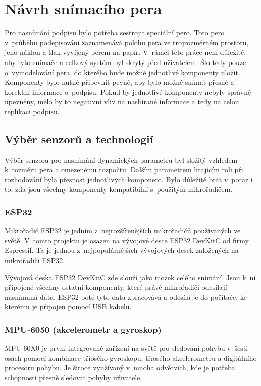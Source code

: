 \chapter{Návrh snímacího pera}
Pro nasnímání podpisu bylo potřeba sestrojit speciální pero.                                        %
Toto pero v~průběhu podepisování zaznamenává polohu pera ve trojrozměrném prostoru,                 %
jeho náklon a tlak vyvíjený perem na papír.                                                         %
V~rámci této práce není důležité, aby tyto snímače a celkový systém byl skrytý před uživatelem.     %
Šlo tedy pouze o~vymodelování pera, do kterého bude možné jednotlivé komponenty uložit.             %
Komponenty bylo nutné připevnit pevně, aby bylo možné snímat přesné a korektní informace o~podpisu. %
Pokud by jednotlivé komponenty nebyly správně upevněny,                                             %
mělo by to negativní vliv na nasbírané informace a tedy na celou replikaci podpisu.                 %

\section{Výběr senzorů a technologií}
Výběr senzorů pro nasnímání dynamických parametrů byl složitý vzhledem k~rozměru pera a omezenému rozpočtu. %
Dalším parametrem hrajícím roli při rozhodování byla přesnost jednotlivých komponent.                       %
Bylo důležité brát v~potaz i to, zda jsou všechny komponenty kompatibilní s~použitým mikrořadičem.          %

\subsection*{ESP32}
Mikrořadič ESP32 je jedním z~nejrozšířenějších mikrořadičů používaných ve světě.                     %
V~tomto projektu je osazen na vývojové desce ESP32 DevKitC od firmy Espressif.                       %
Ta je jednou z~nejpopulárnějších vývojových desek založených na mikrořadiči ESP32.~\cite{Kolban2017} %

Vývojová deska ESP32 DevKitC zde slouží jako mozek celého snímání.                                   %
Jsou k~ní připojené všechny ostatní komponenty, které právě mikrořadiči odesílají nasnímaná data.    %
ESP32 poté tyto data zpracovává a odesílá je do počítače, ke kterému je připojen  pomocí USB kabelu. %

\subsection*{MPU-6050 (akcelerometr a gyroskop)}
MPU-60X0 je první integrované zařízení na světě pro sledování pohybu v~šesti osách pomocí           %
kombinace tříosého gyroskopu, tříosého akcelerometru a digitálního procesoru pohybu.                %
Je široce využívaný v~mnoha odvětvích, kde je potřeba schopnosti přesně sledovat pohyby uživatele.~\cite{InvenSense2015}%

